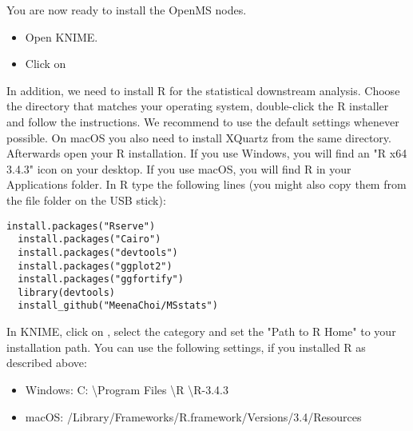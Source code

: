 You are now ready to install the OpenMS nodes.

\begin{itemize}
  \item Open KNIME.
  \item Click on 
\end{itemize}
In addition, we need to install R for the statistical downstream analysis. Choose the directory that matches your operating system, double-click the R installer and follow the instructions. We recommend to use the default settings whenever possible. On macOS you also need to install XQuartz from the same directory. \\
\noindent Afterwards open your R installation. If you use Windows, you will find an "R x64 3.4.3" icon on your desktop. If you use macOS, you will find R in your Applications folder. In R type the following lines (you might also copy them from the file  folder on the USB stick):
\begin{lstlisting}[aboveskip=8pt]
  install.packages("Rserve")
  install.packages("Cairo")
  install.packages("devtools")
  install.packages("ggplot2")
  install.packages("ggfortify")
  library(devtools)
  install_github("MeenaChoi/MSstats")
\end{lstlisting}

\noindent In KNIME, click on , select the category  and set the "Path to R Home" to your installation path. You can use the following settings, if you installed R as described above:
\begin{itemize}
\item Windows: C: \textbackslash Program Files \textbackslash R \textbackslash R-3.4.3 
\item macOS: /Library/Frameworks/R.framework/Versions/3.4/Resources 
\end{itemize}

